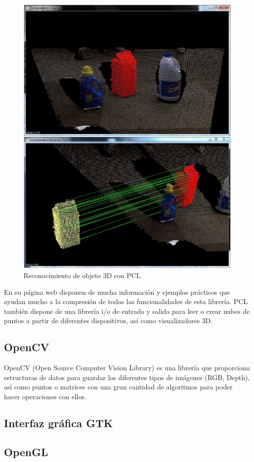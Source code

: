 \begin{figure}[th]
\centering
\includegraphics[scale=0.6]{Figures/correspondence_grouping.png}
\decoRule
\caption[grouping]{Reconocimiento de objeto 3D con PCL}
\label{fig:Grouping}
\end{figure}

En su página web disponen de mucha información y ejemplos prácticos que ayudan mucho a la compresión de todas las funcionalidades de esta librería. PCL también dispone de una librería i/o de entrada y salida para leer o crear nubes de puntos a partir de diferentes dispositivos, así como visualizadores 3D.


\subsection{OpenCV}

OpenCV (Open Source Computer Vision Library) es una librería que proporciona estructuras de datos para guardar los diferentes tipos de imágenes (RGB, Depth), así como puntos o matrices con una gran cantidad de algoritmos para poder hacer operaciones con ellos.

\subsection{Interfaz gráfica GTK}


\subsection{OpenGL}